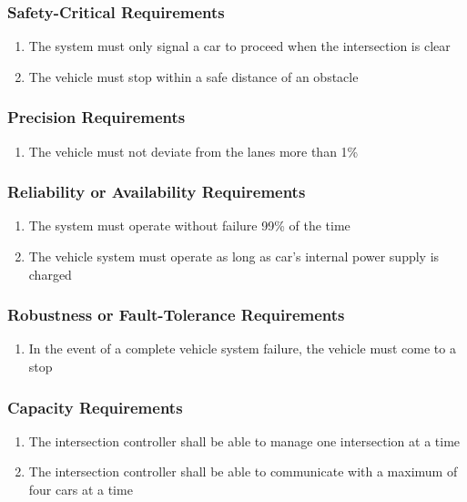 \documentclass [12pt]{article}
\begin{document}
\subsubsection{Safety-Critical Requirements }
	\begin{enumerate}[label=\textbf{\Alph*}:]
		\item The system must only signal a car to proceed when the intersection is clear
		\item The vehicle must stop within a safe distance of an obstacle
	\end{enumerate}	


\subsubsection{Precision Requirements}
	\begin{enumerate}[label=\textbf{\Alph*}:]
		\item The vehicle must not deviate from the lanes more than 1\%
	\end{enumerate}

\subsubsection{Reliability or Availability  Requirements}
	\begin{enumerate}[label=\textbf{\Alph*}:]
		\item The system must operate without failure 99\% of the time
		\item The vehicle system must operate as long as car's internal power supply is charged
	\end{enumerate}



\subsubsection{Robustness or Fault-Tolerance Requirements }
	\begin{enumerate}[label=\textbf{\Alph*}:]
		\item In the event of a complete vehicle system failure, the vehicle must come to a stop
	\end{enumerate}
	
\subsubsection{Capacity Requirements }
	\begin{enumerate}[label=\textbf{\Alph*}:]
		\item The intersection controller shall be able to manage one intersection at a time
		\item The intersection controller shall be able to communicate with a maximum of four cars at a time
	\end{enumerate}
\end{document}
